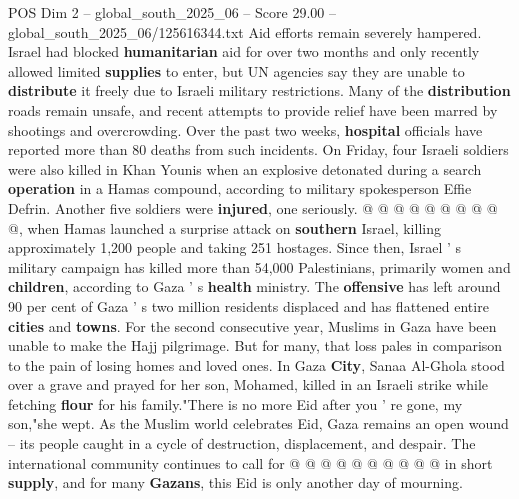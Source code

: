\begin{textsample}{POS Dim 2 – global\_south\_2025\_06 – Score 29.00 – global\_south\_2025\_06/125616344.txt}
Aid efforts remain severely hampered.
Israel had blocked \textbf{humanitarian} aid for over two months and only recently allowed limited \textbf{supplies} to enter, but UN agencies say they are unable to \textbf{distribute} it freely due to Israeli military restrictions.
Many of the \textbf{distribution} roads remain unsafe, and recent attempts to provide relief have been marred by shootings and overcrowding.
Over the past two weeks, \textbf{hospital} officials have reported more than 80 deaths from such incidents.
On Friday, four Israeli soldiers were also killed in Khan Younis when an explosive detonated during a search \textbf{operation} in a Hamas compound, according to military spokesperson Effie Defrin.
Another five soldiers were \textbf{injured}, one seriously. @ @ @ @ @ @ @ @ @ @, when Hamas launched a surprise attack on \textbf{southern} Israel, killing approximately 1,200 people and taking 251 hostages.
Since then, Israel ' s military campaign has killed more than 54,000 Palestinians, primarily women and \textbf{children}, according to Gaza ' s \textbf{health} ministry.
The \textbf{offensive} has left around 90 per cent of Gaza ' s two million residents displaced and has flattened entire \textbf{cities} and \textbf{towns}.
For the second consecutive year, Muslims in Gaza have been unable to make the Hajj pilgrimage.
But for many, that loss pales in comparison to the pain of losing homes and loved ones.
In Gaza \textbf{City}, Sanaa Al-Ghola stood over a grave and prayed for her son, Mohamed, killed in an Israeli strike while fetching \textbf{flour} for his family."There is no more Eid after you ' re gone, my son,"she wept.
As the Muslim world celebrates Eid, Gaza remains an open wound -- its people caught in a cycle of destruction, displacement, and despair.
The international community continues to call for @ @ @ @ @ @ @ @ @ @ in short \textbf{supply}, and for many \textbf{Gazans}, this Eid is only another day of mourning.

\end{textsample}
